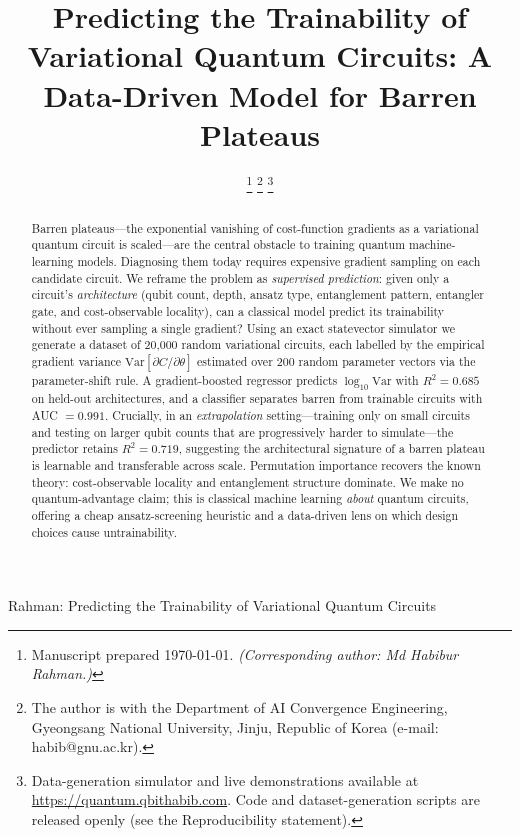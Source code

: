 \documentclass[journal]{IEEEtran}
\newcommand{\Nrows}{20{,}000}                 %
\newcommand{\Samples}{200}                    %
\newcommand{\RsqHold}{0.685}
\newcommand{\AucHold}{0.991}
\newcommand{\RsqExtrap}{0.719}
\begin{document}
\title{Predicting the Trainability of Variational Quantum Circuits:
A Data-Driven Model for Barren Plateaus}

\author{
  \thanks{Manuscript prepared \today. \emph{(Corresponding author: Md Habibur Rahman.)}}%
  \thanks{The author is with the Department of AI Convergence
  Engineering, Gyeongsang National University, Jinju, Republic of Korea
  (e-mail: habib@gnu.ac.kr).}%
  \thanks{Data-generation simulator and live demonstrations available at
  \url{https://quantum.qbithabib.com}. Code and dataset-generation scripts are
  released openly (see the Reproducibility statement).}
}

%
{Rahman: Predicting the Trainability of Variational Quantum Circuits}

\maketitle

\begin{abstract}
Barren plateaus---the exponential vanishing of cost-function gradients as a
variational quantum circuit is scaled---are the central obstacle to training
quantum machine-learning models. Diagnosing them today requires expensive
gradient sampling on each candidate circuit. We reframe the problem as
\emph{supervised prediction}: given only a circuit's \emph{architecture}
(qubit count, depth, ansatz type, entanglement pattern, entangler gate, and
cost-observable locality), can a classical model predict its trainability
without ever sampling a single gradient? Using an exact statevector simulator
we generate a dataset of \Nrows{} random variational circuits, each labelled by
the empirical gradient variance $\mathrm{Var}[\partial C/\partial\theta]$
estimated over \Samples{} random parameter vectors via the parameter-shift
rule. A gradient-boosted regressor predicts $\log_{10}\mathrm{Var}$ with
$R^2 = \RsqHold{}$ on held-out architectures, and a classifier separates barren
from trainable circuits with AUC $= \AucHold{}$. Crucially, in an
\emph{extrapolation} setting---training only on small circuits and testing on
larger qubit counts that are progressively harder to simulate---the predictor
retains $R^2 = \RsqExtrap{}$, suggesting the architectural signature of a barren
plateau is learnable and transferable across scale. Permutation importance
recovers the known theory: cost-observable locality and entanglement structure
dominate. We make no quantum-advantage claim; this is classical machine learning
\emph{about} quantum circuits, offering a cheap ansatz-screening heuristic and a
data-driven lens on which design choices cause untrainability.
\end{abstract}
\end{document}
